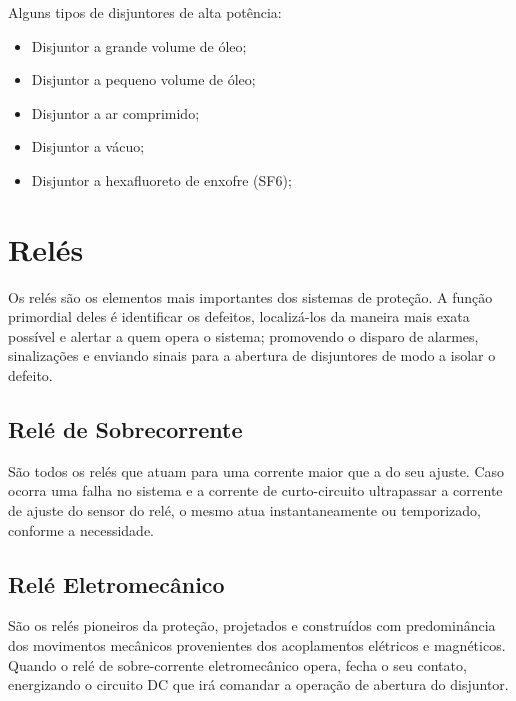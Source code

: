 \documentclass[a5paper]{ufsc-thesis}
\begin{document}
Alguns tipos de disjuntores de alta potência:\par
\begin{itemize}
\item Disjuntor a grande volume de óleo;
\item Disjuntor a pequeno volume de óleo;
\item Disjuntor a ar comprimido;
\item Disjuntor a vácuo;
\item Disjuntor a hexafluoreto de enxofre (SF6); 
\end{itemize}

\section{Relés}
Os relés são os elementos mais importantes dos sistemas de proteção. A função primordial deles é identificar os defeitos, localizá-los da maneira mais exata possível e alertar a quem opera o sistema; promovendo o disparo de alarmes, sinalizações e enviando sinais para a abertura de disjuntores de modo a isolar o defeito.\par

\subsection{Relé de Sobrecorrente}
São todos os relés que atuam para uma corrente maior que a do seu ajuste. Caso ocorra uma falha no sistema e a corrente de curto-circuito ultrapassar a corrente de ajuste do sensor do relé, o mesmo atua instantaneamente ou temporizado, conforme a necessidade.\par

\subsection{Relé Eletromecânico}
São os relés pioneiros da proteção, projetados e construídos com predominância dos movimentos mecânicos provenientes dos acoplamentos elétricos e magnéticos. Quando o relé de sobre-corrente eletromecânico opera, fecha o seu contato, energizando o circuito DC que irá comandar a operação de abertura do disjuntor.\par
\end{document}
